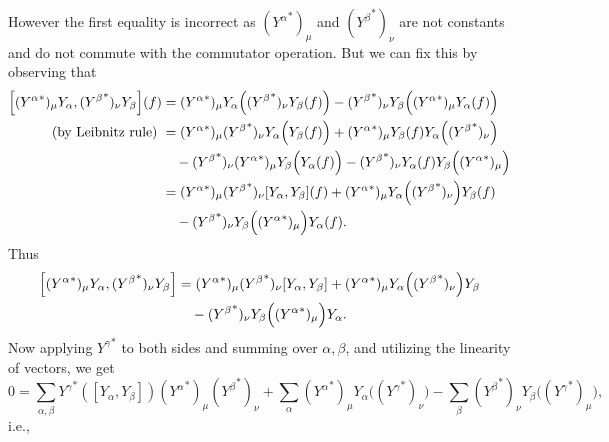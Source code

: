 \documentclass{note}
\numberwithin{equation}{chapter}
\begin{document}
However the first equality is incorrect as $({Y^\alpha}^*)_\mu$ and
$({Y^\beta}^*)_\nu$ are not constants and do not commute with the commutator
operation. But we can fix this by observing that
\begin{align*}
    \left[({Y^\alpha}^*)_\mu Y_\alpha, ({Y^\beta}^*)_\nu Y_\beta\right](f)
     & = ({Y^\alpha}^*)_\mu Y_\alpha\prn{({Y^\beta}^*)_\nu Y_\beta(f)} -
    ({Y^\beta}^*)_\nu Y_\beta\Big(({Y^\alpha}^*)_\mu Y_\alpha(f)\Big)    \\
    \text{(by Leibnitz rule) }
     & =
    ({Y^\alpha}^*)_\mu ({Y^\beta}^*)_\nu Y_\alpha\Big(Y_\beta(f)\Big)
    + ({Y^\alpha}^*)_\mu Y_\beta(f) Y_\alpha\prn{({Y^\beta}^*)_\nu}      \\
     & \quad
    - ({Y^\beta}^*)_\nu ({Y^\alpha}^*)_\mu Y_\beta\Big(Y_\alpha(f)\Big)
    - ({Y^\beta}^*)_\nu Y_\alpha(f) Y_\beta\Big(({Y^\alpha}^*)_\mu\Big)  \\
     & =
    ({Y^\alpha}^*)_\mu ({Y^\beta}^*)_\nu [Y_\alpha, Y_\beta](f)
    + ({Y^\alpha}^*)_\mu Y_\alpha\prn{({Y^\beta}^*)_\nu} Y_\beta(f)      \\
     & \quad
    - ({Y^\beta}^*)_\nu Y_\beta\Big(({Y^\alpha}^*)_\mu\Big) Y_\alpha(f). \\
\end{align*}
Thus
\begin{align*}
    \left[({Y^\alpha}^*)_\mu Y_\alpha, ({Y^\beta}^*)_\nu Y_\beta\right]
     & = ({Y^\alpha}^*)_\mu ({Y^\beta}^*)_\nu [Y_\alpha, Y_\beta]
    + ({Y^\alpha}^*)_\mu Y_\alpha\prn{({Y^\beta}^*)_\nu} Y_\beta      \\
     & \quad
    - ({Y^\beta}^*)_\nu Y_\beta\Big(({Y^\alpha}^*)_\mu\Big) Y_\alpha. \\
\end{align*}
Now applying ${Y^\gamma}^*$ to both sides and summing over $\alpha, \beta$, and
utilizing the linearity of vectors, we get
\begin{equation*}
    0 = \sum_{\alpha,\beta}
    {Y^\gamma}^*([Y_\alpha, Y_\beta]) ({Y^\alpha}^*)_\mu({Y^\beta}^*)_\nu
    + \sum_\alpha ({Y^\alpha}^*)_\mu Y_\alpha\Big(({Y^\gamma}^*)_\nu\Big)
    - \sum_\beta ({Y^\beta}^*)_\nu Y_\beta\Big(({Y^\gamma}^*)_\mu\Big),
\end{equation*}
i.e.,
\end{document}
